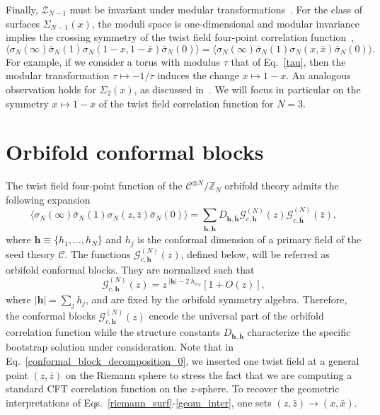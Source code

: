 \documentclass[a4paper,11pt]{article}
\begin{document}
Finally, $\mathcal{Z}_{N-1}$ must be invariant  
under modular transformations~\cite{CardyMod, Cappelli, Cappelli2}.  For the class of surfaces $\Sigma_{N-1}(x)$, the moduli space is one-dimensional and modular invariance implies the crossing
symmetry of the twist field four-point correlation function~\cite{Cardy},
\begin{equation}\label{cross_symmetry}
 \langle \sigma_N(\infty)\bar{\sigma}_N(1)\sigma_N(1-x, 1-\bar{x})\bar{\sigma}_N(0)\rangle=
 \langle \sigma_N(\infty)\bar{\sigma}_N(1)\sigma_N(x, \bar{x})\bar{\sigma}_N(0)\rangle. 
\end{equation}
For example, if we consider a torus with modulus $\tau$ that of Eq.~\eqref{tau},
then the modular transformation $\tau\mapsto-1/\tau$ induces the change
$x\mapsto 1-x$. An analogous observation holds for $\Sigma_{2}(x)$, as discussed in~\cite{Cardy}.
 We will focus in particular on 
the symmetry $x\mapsto 1-x$ of the twist field correlation function for $N=3$. 


\section{Orbifold conformal blocks}\label{sec:conf_blocks}
The twist field four-point function of the $\mathcal{C}^{\otimes N}/\mathbb{Z}_N$ orbifold 
theory admits the following expansion
\begin{equation}\label{conformal_block_decomposition_0}
 \langle \sigma_N (\infty)  \bar{\sigma}_N(1) \sigma_N (z, \bar{z})\bar{\sigma}_N(0)\rangle=
 \sum_{\boldsymbol{h},\boldsymbol{\bar{h}}} D_{\boldsymbol{h}, \boldsymbol{\bar{h}}}
 \mathcal{G}_{c, \boldsymbol{h}}^{(N)}(z)\mathcal{G}_{c,\boldsymbol{\bar{h}}}^{(N)}(\bar{z}),
\end{equation}
where $\boldsymbol{h}\equiv\{h_1, \dots, h_N\}$ and $h_j$ is the conformal dimension of  
a primary field of the seed theory $\mathcal{C}$. The functions $\mathcal{G}_{c, \boldsymbol{h}}^{(N)}(z)$, 
defined below, will be referred as orbifold conformal blocks. They are normalized such that
\begin{equation}
\label{G_asy}
\mathcal{G}_{c, \boldsymbol{h}}^{(N)}(z)=z^{\;|\boldsymbol{h}| -2\; h_{\sigma_N}}\left[1+ O(z)\right],
\end{equation}
where $|\boldsymbol{h}|=\sum_j h_j$, and are fixed by the orbifold symmetry algebra. Therefore, the conformal blocks $\mathcal{G}_{c, \boldsymbol{h}}^{(N)}(z)$ encode the universal part of the orbifold correlation function  while  the structure constants  $D_{\boldsymbol{h}, \boldsymbol{\bar{h}}}$  characterize the specific bootstrap solution under consideration. Note that in Eq.~\eqref{conformal_block_decomposition_0}, we inserted one twist field at a general point $(z,\bar{z})$ on the Riemann sphere to stress the fact that we are computing a standard CFT correlation function on the $z$-sphere. To recover the geometric interpretations of Eqs.~\eqref{riemann_surf}-\eqref{geom_inter}, one sets $(z,\bar{z})\to (x,\bar{x})$.
\end{document}
